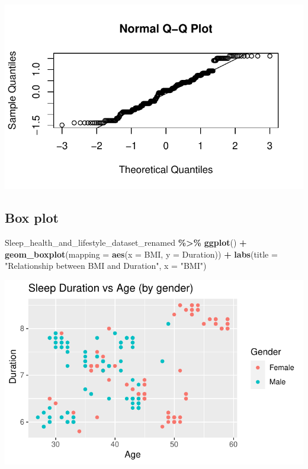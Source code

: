 \documentclass[
  11pt,
]{article}
\newenvironment{Shaded}{\begin{snugshade}}{\end{snugshade}}
\newcommand{\AttributeTok}[1]{\textcolor[rgb]{0.13,0.29,0.53}{#1}}
\newcommand{\FunctionTok}[1]{\textcolor[rgb]{0.13,0.29,0.53}{\textbf{#1}}}
\newcommand{\NormalTok}[1]{#1}
\newcommand{\SpecialCharTok}[1]{\textcolor[rgb]{0.81,0.36,0.00}{\textbf{#1}}}
\newcommand{\StringTok}[1]{\textcolor[rgb]{0.31,0.60,0.02}{#1}}
\begin{document}
\begin{center}\includegraphics[width=0.7\linewidth]{SleepHelath_files/figure-latex/unnamed-chunk-26-1} \end{center}

\hypertarget{box-plot-1}{%
\subsection{Box plot}\label{box-plot-1}}

\begin{Shaded}
\begin{Highlighting}[]
\NormalTok{Sleep\_health\_and\_lifestyle\_dataset\_renamed }\SpecialCharTok{\%\textgreater{}\%}
  \FunctionTok{ggplot}\NormalTok{() }\SpecialCharTok{+}
    \FunctionTok{geom\_boxplot}\NormalTok{(}\AttributeTok{mapping =} \FunctionTok{aes}\NormalTok{(}\AttributeTok{x =}\NormalTok{ BMI, }\AttributeTok{y =}\NormalTok{ Duration)) }\SpecialCharTok{+}
    \FunctionTok{labs}\NormalTok{(}\AttributeTok{title =} \StringTok{"Relationship between BMI and Duration"}\NormalTok{, }\AttributeTok{x =} \StringTok{"BMI"}\NormalTok{)}
\end{Highlighting}
\end{Shaded}

\begin{center}\includegraphics[width=0.7\linewidth]{SleepHelath_files/figure-latex/unnamed-chunk-27-1} \end{center}
\end{document}

